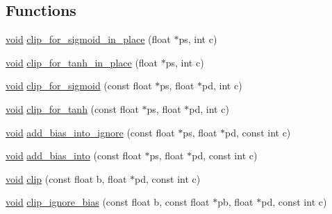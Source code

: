 \subsection*{Functions}
\begin{DoxyCompactItemize}
\item 
\mbox{\hyperlink{mlasi_8h_a88f941d423cb2a819b70a1358982b1a6}{void}} \mbox{\hyperlink{namespaceonnxruntime_1_1rnn_1_1detail_1_1deepcpu_a01ab560a52e774245edc32e83fe452c8}{clip\+\_\+for\+\_\+sigmoid\+\_\+in\+\_\+place}} (float $\ast$ps, int c)
\item 
\mbox{\hyperlink{mlasi_8h_a88f941d423cb2a819b70a1358982b1a6}{void}} \mbox{\hyperlink{namespaceonnxruntime_1_1rnn_1_1detail_1_1deepcpu_ade13495ecdc6b24e88f524a5e1cd7db4}{clip\+\_\+for\+\_\+tanh\+\_\+in\+\_\+place}} (float $\ast$ps, int c)
\item 
\mbox{\hyperlink{mlasi_8h_a88f941d423cb2a819b70a1358982b1a6}{void}} \mbox{\hyperlink{namespaceonnxruntime_1_1rnn_1_1detail_1_1deepcpu_a034813bde0d4b9284702418298320dae}{clip\+\_\+for\+\_\+sigmoid}} (const float $\ast$ps, float $\ast$pd, int c)
\item 
\mbox{\hyperlink{mlasi_8h_a88f941d423cb2a819b70a1358982b1a6}{void}} \mbox{\hyperlink{namespaceonnxruntime_1_1rnn_1_1detail_1_1deepcpu_a49ed3198030c8a96e144cd1dd3cbfb94}{clip\+\_\+for\+\_\+tanh}} (const float $\ast$ps, float $\ast$pd, int c)
\item 
\mbox{\hyperlink{mlasi_8h_a88f941d423cb2a819b70a1358982b1a6}{void}} \mbox{\hyperlink{namespaceonnxruntime_1_1rnn_1_1detail_1_1deepcpu_a21971e995528934d1c65711f56bdeafd}{add\+\_\+bias\+\_\+into\+\_\+ignore}} (const float $\ast$ps, float $\ast$pd, const int c)
\item 
\mbox{\hyperlink{mlasi_8h_a88f941d423cb2a819b70a1358982b1a6}{void}} \mbox{\hyperlink{namespaceonnxruntime_1_1rnn_1_1detail_1_1deepcpu_a1d9034a17f1cfa963791766930c88649}{add\+\_\+bias\+\_\+into}} (const float $\ast$ps, float $\ast$pd, const int c)
\item 
\mbox{\hyperlink{mlasi_8h_a88f941d423cb2a819b70a1358982b1a6}{void}} \mbox{\hyperlink{namespaceonnxruntime_1_1rnn_1_1detail_1_1deepcpu_a8ea6b06af7c12a5578de7d7aaad35ff5}{clip}} (const float b, float $\ast$pd, const int c)
\item 
\mbox{\hyperlink{mlasi_8h_a88f941d423cb2a819b70a1358982b1a6}{void}} \mbox{\hyperlink{namespaceonnxruntime_1_1rnn_1_1detail_1_1deepcpu_a3cfaf91d3560d9f84b376f61461a9973}{clip\+\_\+ignore\+\_\+bias}} (const float b, const float $\ast$pb, float $\ast$pd, const int c)
\item 

\end{DoxyCompactItemize}
